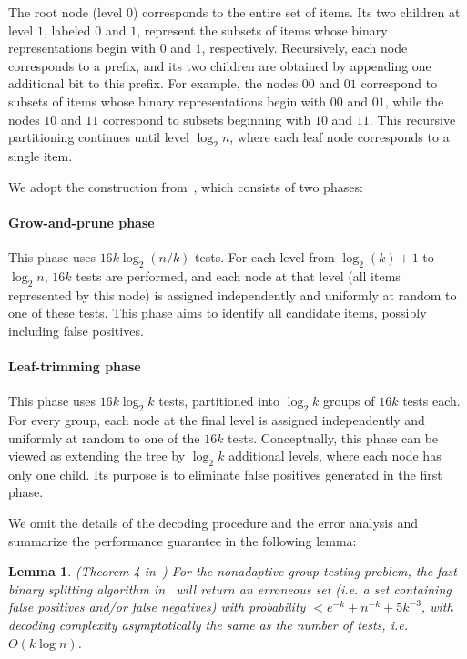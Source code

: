\documentclass{article}
\newtheorem{lemma}{Lemma}[subsection]
\begin{document}
The root node (level $0$) corresponds to the entire set of items. Its two children at level $1$, labeled $0$ and $1$, represent the subsets of items whose binary representations begin with $0$ and $1$, respectively. Recursively, each node corresponds to a prefix, and its two children are obtained by appending one additional bit to this prefix. For example, the nodes $00$ and $01$ correspond to subsets of items whose binary representations begin with $00$ and $01$, while the nodes $10$ and $11$ correspond to subsets beginning with $10$ and $11$. This recursive partitioning continues until level $\log_2 n$, where each leaf node corresponds to a single item.

We adopt the construction from~\cite{wang2023quickly}, which consists of two phases:

\paragraph{Grow-and-prune phase}
This phase uses $16k\log_2(n/k)$ tests. For each level from $\log_2(k)+1$ to $\log_2 n$, $16k$ tests are performed, and each node at that level (all items represented by this node) is assigned independently and uniformly at random to one of these tests. This phase aims to identify all candidate items, possibly including false positives.  

\paragraph{Leaf-trimming phase}
This phase uses $16k\log_2 k $ tests, partitioned into $\log_2 k $ groups of $16k$ tests each. For every group, each node at the final level is assigned independently and uniformly at random to one of the $16k$ tests. Conceptually, this phase can be viewed as extending the tree by $\log_2 k$ additional levels, where each node has only one child. Its purpose is to eliminate false positives generated in the first phase.  

We omit the details of the decoding procedure and the error analysis and summarize the performance guarantee in the following lemma:

\begin{lemma}\label{lem:error1}
    (Theorem 4 in~\cite{wang2023quickly}) For the nonadaptive group testing problem, the fast binary splitting algorithm in~\cite{wang2023quickly} will return an erroneous set (i.e. a set containing false positives and/or false negatives) with probability $<e^{-k}+n^{-k}+5k^{-3}$, with decoding complexity asymptotically the same as the number of tests, i.e. $O(k\log n)$.  
\end{lemma} 
\end{document}
